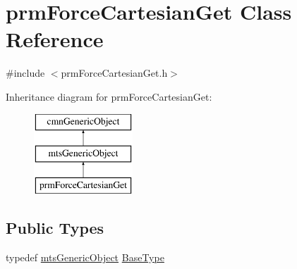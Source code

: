 \hypertarget{classprm_force_cartesian_get}{}\section{prm\+Force\+Cartesian\+Get Class Reference}
\label{classprm_force_cartesian_get}


{\ttfamily \#include $<$prm\+Force\+Cartesian\+Get.\+h$>$}

Inheritance diagram for prm\+Force\+Cartesian\+Get\+:\begin{figure}[H]
\begin{center}
\leavevmode
\includegraphics[height=3.000000cm]{d6/d8c/classprm_force_cartesian_get}
\end{center}
\end{figure}
\subsection*{Public Types}
\begin{DoxyCompactItemize}
\item 
typedef \hyperlink{classmts_generic_object}{mts\+Generic\+Object} \hyperlink{classprm_force_cartesian_get_ac1f56480b9858aece8a2cc7bb2b87e6c}{Base\+Type}
\end{DoxyCompactItemize}
